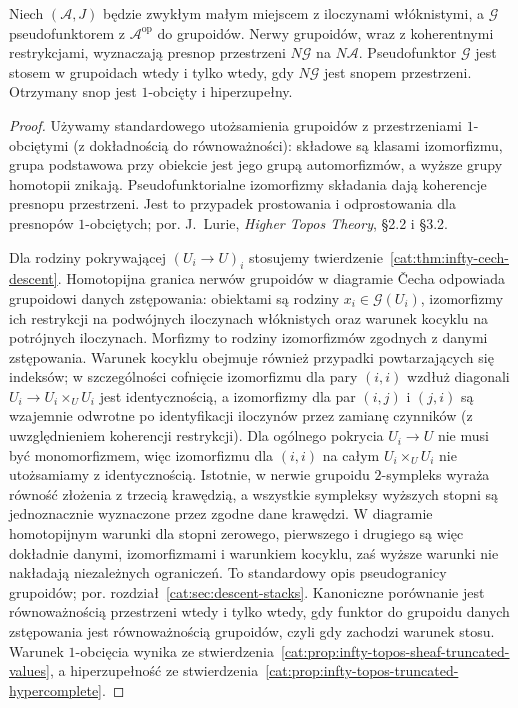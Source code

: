 \begin{stwierdzenie}\label{cat:prop:infty-topos-stacks}
Niech $(\mathcal A,J)$ będzie zwykłym małym miejscem z iloczynami włóknistymi, a $\mathcal G$ pseudofunktorem z $\mathcal A^{\mathrm{op}}$ do grupoidów. Nerwy grupoidów, wraz z koherentnymi restrykcjami, wyznaczają presnop przestrzeni $N\mathcal G$ na $N\mathcal A$. Pseudofunktor $\mathcal G$ jest stosem w grupoidach wtedy i tylko wtedy, gdy $N\mathcal G$ jest snopem przestrzeni. Otrzymany snop jest $1$-obcięty i hiperzupełny.
\end{stwierdzenie}
\begin{proof}
Używamy standardowego utożsamienia grupoidów z przestrzeniami $1$-obciętymi (z dokładnością do równoważności): składowe są klasami izomorfizmu, grupa podstawowa przy obiekcie jest jego grupą automorfizmów, a wyższe grupy homotopii znikają. Pseudofunktorialne izomorfizmy składania dają koherencje presnopu przestrzeni. Jest to przypadek prostowania i odprostowania dla presnopów $1$-obciętych; por. J.~Lurie, \emph{Higher Topos Theory}, \S2.2 i \S3.2.

Dla rodziny pokrywającej $(U_i\to U)_i$ stosujemy twierdzenie~\ref{cat:thm:infty-cech-descent}. Homotopijna granica nerwów grupoidów w diagramie Čecha odpowiada grupoidowi danych zstępowania: obiektami są rodziny $x_i\in\mathcal G(U_i)$, izomorfizmy ich restrykcji na podwójnych iloczynach włóknistych oraz warunek kocyklu na potrójnych iloczynach. Morfizmy to rodziny izomorfizmów zgodnych z danymi zstępowania. Warunek kocyklu obejmuje również przypadki powtarzających się indeksów; w szczególności cofnięcie izomorfizmu dla pary $(i,i)$ wzdłuż diagonali $U_i\to U_i\times_U U_i$ jest identycznością, a izomorfizmy dla par $(i,j)$ i $(j,i)$ są wzajemnie odwrotne po identyfikacji iloczynów przez zamianę czynników (z uwzględnieniem koherencji restrykcji). Dla ogólnego pokrycia $U_i\to U$ nie musi być monomorfizmem, więc izomorfizmu dla $(i,i)$ na całym $U_i\times_U U_i$ nie utożsamiamy z identycznością. Istotnie, w nerwie grupoidu $2$-sympleks wyraża równość złożenia z trzecią krawędzią, a wszystkie sympleksy wyższych stopni są jednoznacznie wyznaczone przez zgodne dane krawędzi. W diagramie homotopijnym warunki dla stopni zerowego, pierwszego i drugiego są więc dokładnie danymi, izomorfizmami i warunkiem kocyklu, zaś wyższe warunki nie nakładają niezależnych ograniczeń. To standardowy opis pseudogranicy grupoidów; por. rozdział~\ref{cat:sec:descent-stacks}. Kanoniczne porównanie jest równoważnością przestrzeni wtedy i tylko wtedy, gdy funktor do grupoidu danych zstępowania jest równoważnością grupoidów, czyli gdy zachodzi warunek stosu. Warunek $1$-obcięcia wynika ze stwierdzenia~\ref{cat:prop:infty-topos-sheaf-truncated-values}, a hiperzupełność ze stwierdzenia~\ref{cat:prop:infty-topos-truncated-hypercomplete}.
\end{proof}

